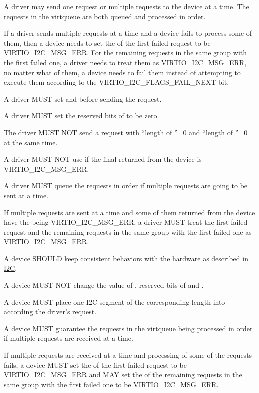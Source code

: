 A driver may send one request or multiple requests to the device at a time.
The requests in the virtqueue are both queued and processed in order.

If a driver sends multiple requests at a time and a device fails to process
some of them, then a device needs to set the  of the first failed request
to be VIRTIO_I2C_MSG_ERR. For the remaining requests in the same group with
the first failed one, a driver needs to treat them as VIRTIO_I2C_MSG_ERR, no matter
what  of them, a device needs to fail them instead of attempting to
execute them according to the VIRTIO_I2C_FLAGS_FAIL_NEXT bit.


A driver MUST set  and  before sending the request.

A driver MUST set the reserved bits of  to be zero.

The driver MUST NOT send a request with ``length of ''=0 and
``length of ''=0 at the same time.

A driver MUST NOT use  if the final  returned
from the device is VIRTIO_I2C_MSG_ERR.

A driver MUST queue the requests in order if multiple requests are going to
be sent at a time.

If multiple requests are sent at a time and some of them returned from the
device have the  being VIRTIO_I2C_MSG_ERR, a driver MUST treat
the first failed request and the remaining requests in the same group with
the first failed one as VIRTIO_I2C_MSG_ERR.


A device SHOULD keep consistent behaviors with the hardware as described in
\hyperref[intro:I2C]{I2C}.

A device MUST NOT change the value of , reserved bits of 
and .

A device MUST place one I2C segment of the corresponding length into 
according the driver's request.

A device MUST guarantee the requests in the virtqueue being processed in order
if multiple requests are received at a time.

If multiple requests are received at a time and processing of some of the
requests fails, a device MUST set the  of the first failed
request to be VIRTIO_I2C_MSG_ERR and MAY set the  of the
remaining requests in the same group with the first failed one
to be VIRTIO_I2C_MSG_ERR.
